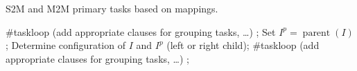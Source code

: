 \documentclass[a4paper,11pt]{article}
\theoremstyle{plain}
\theoremstyle{definition}
\theoremstyle{remark}
\DeclareMathOperator{\parent}{parent}
\begin{document}
\begin{algorithm}
  \caption{S2M and M2M primary tasks based on mappings.} \label{alg:s2m_and_m2m_mapping}
  \begin{algorithmic}[1] 
    \State \#taskloop (add appropriate clauses for grouping tasks, \ldots)
        \State {};
      \EndFor
    \EndFunction
    \Statex
      \State Set $I^p = \parent(I)$;
      \State Determine configuration of $I$ and $I^p$ (left or right child);
      \State \#taskloop (add appropriate clauses for grouping tasks, \ldots)
        \State {};
      \EndFor
    \EndFunction
  \end{algorithmic}
\end{algorithm}
\end{document}
